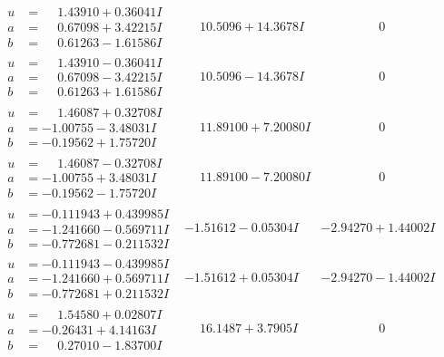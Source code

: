 \documentclass[1p]{elsarticle_modified}
\theoremstyle{definition}
\begin{document}
$$\begin{array}{c|c|c}
\begin{aligned}
u &= \phantom{-}1.43910 + 0.36041 I \\
a &= \phantom{-}0.67098 + 3.42215 I \\
b &= \phantom{-}0.61263 - 1.61586 I\end{aligned}
 & \phantom{-}10.5096 + 14.3678 I & \phantom{-0.000000 } 0 \\ \hline\begin{aligned}
u &= \phantom{-}1.43910 - 0.36041 I \\
a &= \phantom{-}0.67098 - 3.42215 I \\
b &= \phantom{-}0.61263 + 1.61586 I\end{aligned}
 & \phantom{-}10.5096 - 14.3678 I & \phantom{-0.000000 } 0 \\ \hline\begin{aligned}
u &= \phantom{-}1.46087 + 0.32708 I \\
a &= -1.00755 - 3.48031 I \\
b &= -0.19562 + 1.75720 I\end{aligned}
 & \phantom{-}11.89100 + 7.20080 I & \phantom{-0.000000 } 0 \\ \hline\begin{aligned}
u &= \phantom{-}1.46087 - 0.32708 I \\
a &= -1.00755 + 3.48031 I \\
b &= -0.19562 - 1.75720 I\end{aligned}
 & \phantom{-}11.89100 - 7.20080 I & \phantom{-0.000000 } 0 \\ \hline\begin{aligned}
u &= -0.111943 + 0.439985 I \\
a &= -1.241660 - 0.569711 I \\
b &= -0.772681 - 0.211532 I\end{aligned}
 & -1.51612 - 0.05304 I & -2.94270 + 1.44002 I \\ \hline\begin{aligned}
u &= -0.111943 - 0.439985 I \\
a &= -1.241660 + 0.569711 I \\
b &= -0.772681 + 0.211532 I\end{aligned}
 & -1.51612 + 0.05304 I & -2.94270 - 1.44002 I \\ \hline\begin{aligned}
u &= \phantom{-}1.54580 + 0.02807 I \\
a &= -0.26431 + 4.14163 I \\
b &= \phantom{-}0.27010 - 1.83700 I\end{aligned}
 & \phantom{-}16.1487 + 3.7905 I & \phantom{-0.000000 } 0\\

\end{array}$$
\end{document}
